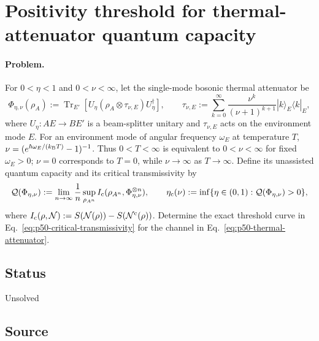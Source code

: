 \section{Positivity threshold for thermal-attenuator quantum capacity}
\label{sec:op_2beed65d248be57a}

\paragraph{Problem.}
For $0<\eta<1$ and $0<\nu<\infty$, let the single-mode bosonic thermal
attenuator be
\begin{equation}
  \Phi_{\eta,\nu}(\rho_A)
  :=\operatorname{Tr}_{E'}\!\left[
     U_\eta(\rho_A\otimes\tau_{\nu,E})U_\eta^\dagger
  \right],
  \qquad
  \tau_{\nu,E}:=\sum_{k=0}^{\infty}
     \frac{\nu^k}{(\nu+1)^{k+1}}
     |k\rangle_E\!\langle k|_E,
  \label{eq:p50-thermal-attenuator}
\end{equation}
where $U_\eta:AE\to BE'$ is a beam-splitter unitary and
$\tau_{\nu,E}$ acts on the environment mode $E$.  For an environment mode
of angular frequency $\omega_E$ at temperature $T$,
$\nu=(e^{\hbar\omega_E/(k_{\rm B}T)}-1)^{-1}$.  Thus $0<T<\infty$ is
equivalent to $0<\nu<\infty$ for fixed $\omega_E>0$; $\nu=0$ corresponds
to $T=0$, while $\nu\to\infty$ as $T\to\infty$.  Define its unassisted quantum
capacity and its critical transmissivity by
\begin{equation}
  \mathcal Q(\Phi_{\eta,\nu})
  :=\lim_{n\to\infty}\frac1n\sup_{\rho_{A^n}}
       I_{\rm c}(\rho_{A^n},\Phi_{\eta,\nu}^{\otimes n}),
  \qquad
  \eta_{\rm c}(\nu)
  :=\inf\{\eta\in(0,1):\mathcal Q(\Phi_{\eta,\nu})>0\},
  \label{eq:p50-critical-transmissivity}
\end{equation}
where $I_{\rm c}(\rho,\mathcal N)
:=S(\mathcal N(\rho))-S(\mathcal N^{\rm c}(\rho))$.  Determine the exact
threshold curve in Eq.~\eqref{eq:p50-critical-transmissivity} for the channel
in Eq.~\eqref{eq:p50-thermal-attenuator}.

\subsection*{Status}

Unsolved

\subsection*{Source}

